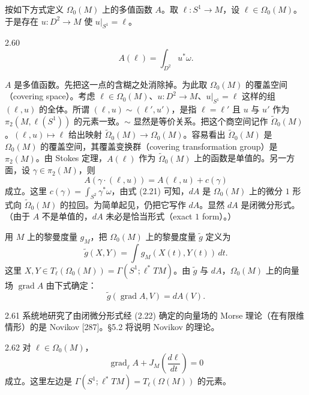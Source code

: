 按如下方式定义 $\Omega_0(M)$ 上的多值函数 $A$。取 $\ell\colon S^1\to M$，设 $\ell\in\Omega_0(M)$。于是存在 $u\colon D^2\to M$ 使 $u|_{S^1}=\ell$。

\begin{definition}{2.60}
\[
  A(\ell)=\int_{D^2}u^*\omega .
\]
\end{definition}

$A$ 是多值函数。先把这一点的含糊之处消除掉。为此取 $\Omega_0(M)$ 的覆盖空间（covering space）。考虑 $\ell\in\Omega_0(M)$、$u\colon D^2\to M$、$u|_{S^1}=\ell$ 这样的组 $(\ell,u)$ 的全体。所谓 $(\ell,u)\sim(\ell',u')$，是指 $\ell=\ell'$ 且 $u$ 与 $u'$ 作为 $\pi_2(M,\ell(S^1))$ 的元素一致。$\sim$ 显然是等价关系。把这个商空间记作 $\widetilde{\Omega}_0(M)$。$(\ell,u)\mapsto\ell$ 给出映射 $\widetilde{\Omega}_0(M)\to\Omega_0(M)$。容易看出 $\widetilde{\Omega}_0(M)$ 是 $\Omega_0(M)$ 的覆盖空间，其覆盖变换群（covering transformation group）是 $\pi_2(M)$。由 Stokes 定理，$A(\ell)$ 作为 $\widetilde{\Omega}_0(M)$ 上的函数是单值的。另一方面，设 $\gamma\in\pi_2(M)$，则
\begin{equation}
  A(\gamma\cdot(\ell,u))=A(\ell,u)+c(\gamma) \tag{2.21}
\end{equation}
成立。这里 $c(\gamma)=\int_{S^2}\gamma^*\omega$，由式 (2.21) 可知，$dA$ 是 $\Omega_0(M)$ 上的微分 $1$ 形式向 $\widetilde{\Omega}_0(M)$ 的拉回。为简单起见，仍把它写作 $dA$。显然 $dA$ 是闭微分形式。（由于 $A$ 不是单值的，$dA$ 未必是恰当形式（exact $1$ form）。）


用 $M$ 上的黎曼度量 $g_M$，把 $\Omega_0(M)$ 上的黎曼度量 $\tilde g$ 定义为
\[
  \tilde g(X,Y)=\int g_M(X(t),Y(t))\,dt .
\]
这里 $X,Y\in T_\ell(\Omega_0(M))=\Gamma(S^1;\ell^*TM)$。由 $\tilde g$ 与 $dA$，$\Omega_0(M)$ 上的向量场 $\operatorname{grad}A$ 由下式确定：
\begin{equation}
  \tilde g(\operatorname{grad}A,V)=dA(V). \tag{2.22}
\end{equation}

\begin{remark}{2.61}
  系统地研究了由闭微分形式经 (2.22) 确定的向量场的 Morse 理论（在有限维情形）的是 Novikov [287]。§5.2 将说明 Novikov 的理论。
\end{remark}

\begin{proposition*}{2.62}
  对 $\ell\in\Omega_0(M)$，
  \begin{equation}
    \operatorname{grad}_\ell A+J_M\left(\frac{d\ell}{dt}\right)=0 \tag{2.23}
  \end{equation}
  成立。这里左边是 $\Gamma(S^1;\ell^*TM)=T_\ell(\Omega(M))$ 的元素。
\end{proposition*}


